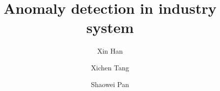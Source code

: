 \documentclass{amsart}
\begin{document}
%
%
\title[A Short Running Title]{Anomaly detection in industry system}%

\author{Xin Han}
\address[A.~1]{School of Computer Science,\\
Xi'an Shiyou University, Shaanxi 710065, China}%

\author{Xichen Tang}
\address[A.~2]{School of Information and Control Engieering \\
Qingdao University of Technology, Qingdao 266033, China}%


\author{Shaowei Pan}
\address[A.~3]{School of Computer Science \\
Xi'an Shiyou University, Shaanxi 710065, China}%

%
%
\date{\gitAuthorDate}%


\maketitle







\end{document}
